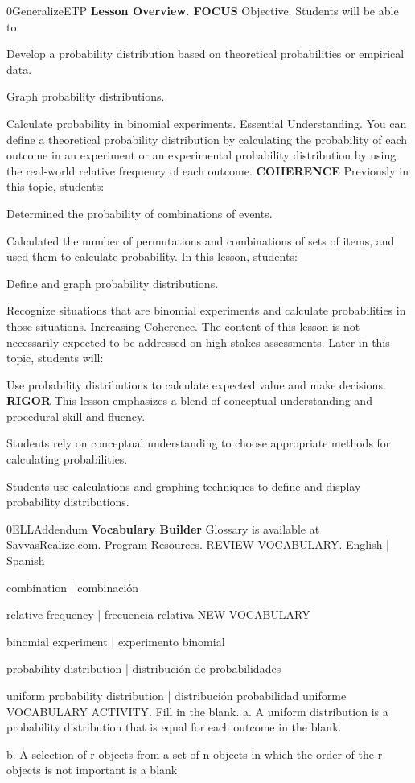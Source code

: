 \documentclass{article}
\newenvironment{te-addendum}[2]{}{}     %
\newcommand{\answer}[1]{}               %
\begin{document}
\begin{te-addendum}{0}{GeneralizeETP}
\textbf{Lesson Overview. FOCUS}
Objective. Students will be able to:
\item Develop a probability distribution based on theoretical probabilities or empirical data.
\item Graph probability distributions.
\item Calculate probability in binomial experiments.
Essential Understanding. You can define a theoretical probability distribution by calculating the probability of each outcome in an experiment or an experimental probability distribution by using the real-world relative frequency of each outcome.
\textbf{COHERENCE}
Previously in this topic, students:
\item Determined the probability of combinations of events.
\item Calculated the number of permutations and combinations of sets of items, and used them to calculate probability.
In this lesson, students:
\item Define and graph probability distributions.
\item Recognize situations that are binomial experiments and calculate probabilities in those situations.
Increasing Coherence. The content of this lesson is not necessarily expected to be addressed on high-stakes assessments.
Later in this topic, students will:
\item Use probability distributions to calculate expected value and make decisions.
\textbf{RIGOR}
This lesson emphasizes a blend of conceptual understanding and procedural skill and fluency.
\item Students rely on conceptual understanding to choose appropriate methods for calculating probabilities.
\item Students use calculations and graphing techniques to define and display probability distributions.
\end{te-addendum}
\begin{te-addendum}{0}{ELLAddendum}
\textbf{Vocabulary Builder}
Glossary is available at SavvasRealize.com. Program Resources.
REVIEW VOCABULARY. English | Spanish
\item combination | combinación
\item relative frequency | frecuencia relativa
NEW VOCABULARY
\item binomial experiment | experimento binomial
\item probability distribution | distribución de probabilidades
\item uniform probability distribution | distribución probabilidad uniforme
VOCABULARY ACTIVITY. Fill in the blank.
a. A uniform distribution is a probability distribution that is equal for each outcome in the blank.
\answer{sample space}
b. A selection of r objects from a set of n objects in which the order of the r objects is not important is a blank
\answer{combination}
\end{te-addendum}
\end{document}
